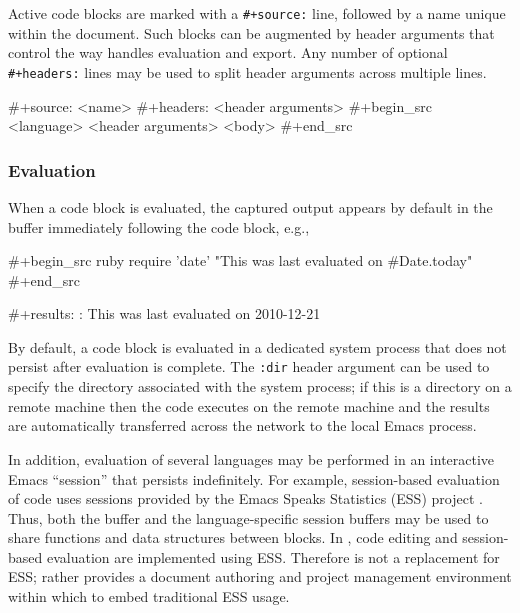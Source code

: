 \documentclass[article,shortnames]{jss}
\begin{document}
Active code blocks are marked with a \texttt{\#+source:} line, followed by a
name unique within the document.  Such blocks can be augmented by
header arguments that control the way  handles evaluation and
export.  Any number of optional \texttt{\#+headers:} lines may be used to
split header arguments across multiple lines.

\begin{Code}
#+source: <name>
#+headers: <header arguments>
#+begin_src <language> <header arguments>
  <body>
#+end_src
\end{Code}
\subsubsection{Evaluation}
\label{sec-3-2-2}


When a code block is evaluated, the captured output appears by default
in the  buffer immediately following the code block, e.g.,

\begin{Code}
#+begin_src ruby
  require 'date'
  "This was last evaluated on #{Date.today}"
#+end_src

#+results:
: This was last evaluated on 2010-12-21
\end{Code}







By default, a code block is evaluated in a dedicated system process
that does not persist after evaluation is complete. The \texttt{:dir} header
argument can be used to specify the directory associated with the
system process; if this is a directory on a remote machine then the
code executes on the remote machine and the results are automatically
transferred across the network to the local Emacs process.

In addition, evaluation of several languages may be performed in an
interactive Emacs ``session'' that persists indefinitely. For example,
session-based evaluation of  code uses  sessions provided by the
Emacs Speaks Statistics (ESS) project \citep{ess}.  Thus, both the 
buffer and the language-specific session buffers may be used to
share functions and data structures between blocks. In ,
 code editing and session-based  evaluation are implemented using
ESS. Therefore  is not a replacement for ESS; rather 
provides a document authoring and project management environment
within which to embed traditional ESS usage.
\end{document}
